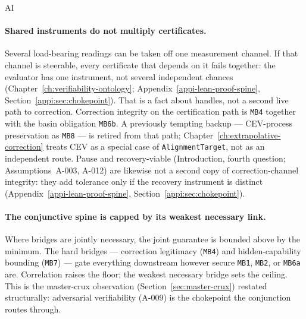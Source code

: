 \begin{authbar}{AI}
\paragraph{Shared instruments do not multiply certificates.}
Several load-bearing readings can be taken off one measurement channel.
If that channel is steerable, every certificate that depends on it fails together: the evaluator has one instrument, not several independent chances (Chapter~\ref{ch:verifiability-ontology}; Appendix~\ref{appi-lean-proof-spine}, Section~\ref{appi:sec:chokepoint}).
That is a fact about handles, not a second live path to correction.
Correction integrity on the certification path is \texttt{MB4} together with the basin obligation \texttt{MB6b}.
A previously tempting backup --- CEV-process preservation as \texttt{MB8} --- is retired from that path; Chapter~\ref{ch:extrapolative-correction} treats CEV as a special case of \texttt{AlignmentTarget}, not as an independent route.
Pause and recovery-viable (Introduction, fourth question; Assumptions~A-003, A-012) are likewise not a second copy of correction-channel integrity: they add tolerance only if the recovery instrument is distinct (Appendix~\ref{appi-lean-proof-spine}, Section~\ref{appi:sec:chokepoint}).

\paragraph{The conjunctive spine is capped by its weakest necessary link.}
Where bridges are jointly necessary, the joint guarantee is bounded above by the minimum.
The hard bridges --- correction legitimacy (\texttt{MB4}) and hidden-capability bounding (\texttt{MB7}) --- gate everything downstream however secure \texttt{MB1}, \texttt{MB2}, or \texttt{MB6a} are.
Correlation raises the floor; the weakest necessary bridge sets the ceiling.
This is the master-crux observation (Section~\ref{sec:master-crux}) restated structurally: adversarial verifiability (A-009) is the chokepoint the conjunction routes through.


\end{authbar}
